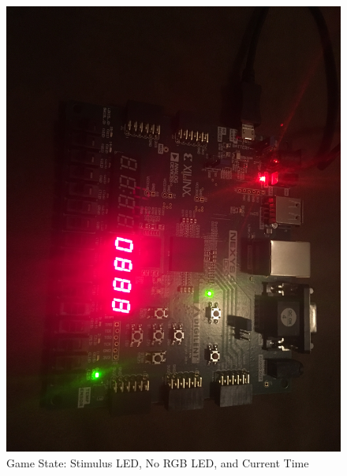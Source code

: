 \documentclass{article}
\begin{document}
\begin{center}
	\begin{figure}
		\includegraphics[width=.9\linewidth]{Game.JPG}
		\caption{Game State: Stimulus LED, No RGB LED, and Current Time}
		\label{fig:GameImg}
	\end{figure}


\end{center}
\end{document}
